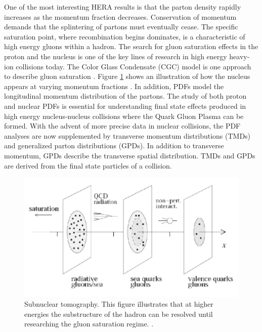 One of the most interesting HERA results is that the parton density rapidly increases as the momentum fraction decreases. Conservation of momentum demands that the splintering of partons must eventually cease. The specific saturation point, where recombination begins dominates, is a characteristic of high energy gluons within a hadron. The search for gluon saturation effects in the proton and the nucleus is one of the key lines of research in high energy heavy-ion collisions today. The Color Glass Condensate (CGC) model is one approach to describe gluon saturation \cite{CGC2Lec}. Figure \ref{fig:nuclImag} shows an illustration of how the nucleus appears at varying momentum fractions \cite{Accardi:2011mz}. In addition, PDFs model the longitudinal momentum distribution of the partons. The study of both proton and nuclear PDFs is essential for understanding final state effects produced in high energy nucleus-nucleus collisions where the Quark Gluon Plasma can be formed. With the advent of more precise data in nuclear collisions, the PDF analyses are now supplemented by transverse momentum distributions (TMDs) and generalized parton distributions (GPDs). In addition to transverse momentum, GPDs describe the transverse spatial distribution. TMDs and GPDs are derived from the final state particles of a collision.

\begin{figure}[h!]
\begin{centering}
\includegraphics[width=5in]{Chapter1/importfigs/imaging_the_nucleon_upc_dijets_pres.png}
\par\end{centering}
\caption{Subnuclear tomography. This figure illustrates that at higher energies the substructure of the hadron can be resolved until researching the gluon saturation regime.  \cite{Accardi:2011mz}. \label{fig:nuclImag}}
\end{figure}

